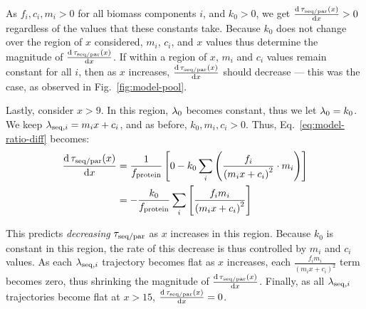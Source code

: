 As $f_{i}, c_{i}, m_{i} > 0$ for all biomass components $i$, and $k_{0} > 0$, we get $\frac{\mathrm{d} \, \tau_{\mathrm{seq}/\mathrm{par}}(x)}{\mathrm{d} x} > 0$ regardless of the values that these constants take.
Because $k_{0}$ does not change over the region of $x$ considered, $m_{i}$, $c_{i}$, and $x$ values thus determine the magnitude of $\frac{\mathrm{d} \, \tau_{\mathrm{seq}/\mathrm{par}}(x)}{\mathrm{d} x}$.
If within a region of $x$, $m_{i}$ and $c_{i}$ values remain constant for all $i$, then as $x$ increases, $\frac{\mathrm{d} \, \tau_{\mathrm{seq}/\mathrm{par}}(x)}{\mathrm{d} x}$ should decrease --- this was the case, as observed in Fig.\ \ref{fig:model-pool}.

Lastly, consider $x > 9$.
In this region, $\lambda_{0}$ becomes constant, thus we let $\lambda_{0} = k_{0}$.
We keep $\lambda_{\mathrm{seq},i} = m_{i}x + c_{i}$, and as before, $k_{0}, m_{i}, c_{i} > 0$.
Thus, Eq.\ \ref{eq:model-ratio-diff} becomes:
\begin{equation}
  \begin{aligned}
  \frac{\mathrm{d} \, \tau_{\mathrm{seq}/\mathrm{par}}(x)}{\mathrm{d} x} &= \frac{1}{f_{\mathrm{protein}}} \left[ 0 - k_{0} \sum_{i}\left( \frac{f_{i}}{{(m_{i}x+c_{i})}^{2}} \cdot m_{i} \right) \right]\\
  &= -\frac{k_{0}}{f_{\mathrm{protein}}} \sum_{i}\left[ \frac{f_{i}m_{i}}{{(m_{i}x+c_{i})}^{2}} \right]
  \end{aligned}
  \label{eq:model-ratio-diff-largex}
\end{equation}

This predicts \emph{decreasing} $\tau_{\mathrm{seq}/\mathrm{par}}$ as $x$ increases in this region.
Because $k_{0}$ is constant in this region, the rate of this decrease is thus controlled by $m_{i}$ and $c_{i}$ values.
As each $\lambda_{\mathrm{seq},i}$ trajectory becomes flat as $x$ increases, each $\frac{f_{i}m_{i}}{{(m_{i}x+c_{i})}^{2}}$ term becomes zero, thus shrinking the magnitude of $\frac{\mathrm{d} \, \tau_{\mathrm{seq}/\mathrm{par}}(x)}{\mathrm{d} x}$.
Finally, as all $\lambda_{\mathrm{seq},i}$ trajectories become flat at $x > 15$, $\frac{\mathrm{d} \, \tau_{\mathrm{seq}/\mathrm{par}}(x)}{\mathrm{d} x} = 0$.
